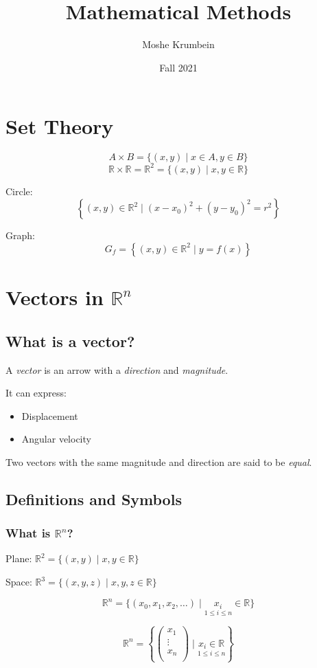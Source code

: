 \documentclass[00_complete]{subfiles}
\title{Mathematical Methods}
\author{Moshe Krumbein}
\date{Fall 2021}
\begin{document}

\section{Set Theory}

$$A \times B = \{(x,y) \;|\; x \in A, y \in B\}$$
$$\mathbb{R} \times \mathbb{R} = \mathbb{R}^2 = \{(x,y)\;|\;x,y \in \mathbb{R}\}$$

Circle:
$$\left\{(x,y) \in \mathbb{R}^2 \;|\; (x-x_0)^2 + (y-y_0)^2 = r^2\right\}$$

Graph:
$$G_f = \left\{(x,y) \in \mathbb{R}^2 \;|\; y=f(x)\right\}$$

\section{Vectors in \texorpdfstring{$\mathbb{R}^n$}{Rn}}

\subsection{What is a vector?}

A \emph{vector} is an arrow with a \emph{direction} and \emph{magnitude}.

It can express:
\begin{itemize} \tightlist
    \item Displacement
    \item Angular velocity
\end{itemize}

Two vectors with the same magnitude and direction are said to be \emph{equal}.
\subsection{Definitions and Symbols}

\subsubsection{What is \texorpdfstring{$\mathbb{R}^n$}{Rn}?}

Plane: $\mathbb{R}^2=\{(x,y)\;|\;x,y \in \mathbb{R}\}$

Space: $\mathbb{R}^3=\{(x,y,z)\;|\;x,y,z \in \mathbb{R}\}$

$$\mathbb{R}^n = \{(x_0,x_1,x_2,\dots)\;|\;\underset{1 \leq i \leq n}{x_i} \in \mathbb{R}\}$$

$$\mathbb{R}^n=\left\{
\begin{pmatrix}
   x_1 \\
   \vdots \\
   x_n \\
\end{pmatrix} \;|\;
\underset{1 \leq i \leq n}{x_i \in \mathbb{R}}
\right\}$$
\end{document}
